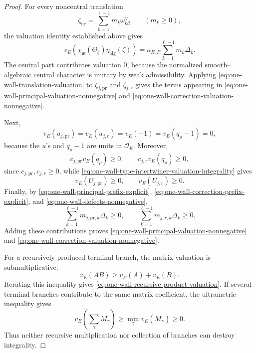 \documentclass[10pt,a4paper]{amsart}
\newcommand{\Ocoeff}{\mathcal O_E}
\begin{document}
\begin{proof}
For every noncentral translation
\[
 \zeta_{\mathrm{nc}}
 =
 \sum_{k=1}^{\ell-1}m_k\omega_{kd}^\vee
 \qquad(m_k\geq0),
\]
the valuation identity established above gives
\begin{equation}\label{eq:one-wall-translation-valuation}
 v_E\!\left(
 \chi_{\mathfrak m}(\Theta_\zeta)
 \eta_{\mathrm{alg}}(\zeta)
 \right)
 =
 \kappa_{E,F}
 \sum_{k=1}^{\ell-1}m_k\Delta_k.
\end{equation}
The central part contributes valuation \(0\), because the normalized
smooth--algebraic central character is unitary by weak admissibility.
Applying \eqref{eq:one-wall-translation-valuation} to
\(\zeta_{j,\mathrm{pr}}\) and \(\zeta_{j,r}\) gives the terms appearing
in \eqref{eq:one-wall-principal-valuation-nonnegative} and
\eqref{eq:one-wall-correction-valuation-nonnegative}.

Next,
\[
 v_E(u_{j,\mathrm{pr}})
 =
 v_E(u_{j,r})
 =
 v_E(-1)
 =
 v_E(q_\rho-1)
 =
 0,
\]
because the \(u\)'s and \(q_\rho-1\) are units in \(\Ocoeff\).  Moreover,
\[
 c_{j,\mathrm{pr}}v_E(q_\rho)\geq0,
 \qquad
 c_{j,r}v_E(q_\rho)\geq0,
\]
since \(c_{j,\mathrm{pr}},c_{j,r}\geq0\), while
\eqref{eq:one-wall-type-intertwiner-valuation-integrality} gives
\[
 v_E(U_{j,\mathrm{pr}})\geq0,
 \qquad
 v_E(U_{j,r})\geq0.
\]
Finally, by
\eqref{eq:one-wall-principal-prefix-explicit},
\eqref{eq:one-wall-correction-prefix-explicit}, and
\eqref{eq:one-wall-defects-nonnegative},
\[
 \sum_{k=1}^{\ell-1}
 m_{j,\mathrm{pr},k}\Delta_k\geq0,
 \qquad
 \sum_{k=1}^{\ell-1}
 m_{j,r,k}\Delta_k\geq0.
\]
Adding these contributions proves
\eqref{eq:one-wall-principal-valuation-nonnegative} and
\eqref{eq:one-wall-correction-valuation-nonnegative}.

For a recursively produced terminal branch, the matrix valuation is
submultiplicative:
\[
 v_E(AB)\geq v_E(A)+v_E(B).
\]
Iterating this inequality gives
\eqref{eq:one-wall-recursive-product-valuation}.  If several terminal
branches contribute to the same matrix coefficient, the ultrametric
inequality gives
\[
 v_E\!\left(\sum_\gamma M_\gamma\right)
 \geq
 \min_\gamma v_E(M_\gamma)
 \geq0.
\]
Thus neither recursive multiplication nor collection of branches can
destroy integrality.
\end{proof}
\end{document}

